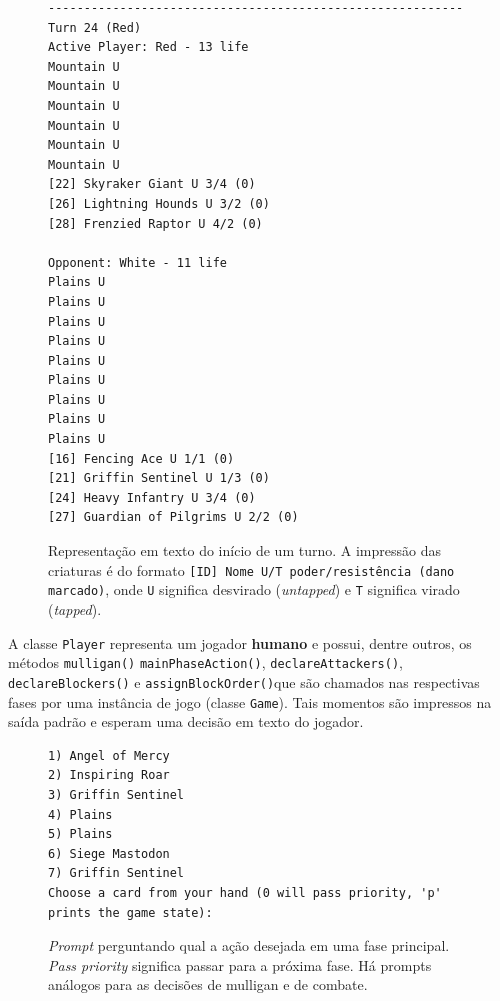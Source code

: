 \begin{figure}[h!]
\begin{Verbatim}
----------------------------------------------------------
Turn 24 (Red)
Active Player: Red - 13 life
Mountain U
Mountain U
Mountain U
Mountain U
Mountain U
Mountain U
[22] Skyraker Giant U 3/4 (0)
[26] Lightning Hounds U 3/2 (0)
[28] Frenzied Raptor U 4/2 (0)

Opponent: White - 11 life
Plains U
Plains U
Plains U
Plains U
Plains U
Plains U
Plains U
Plains U
Plains U
[16] Fencing Ace U 1/1 (0)
[21] Griffin Sentinel U 1/3 (0)
[24] Heavy Infantry U 3/4 (0)
[27] Guardian of Pilgrims U 2/2 (0)
\end{Verbatim}
\caption{Representação em texto do início de um turno. A impressão das criaturas é do formato \texttt{[ID] Nome U/T poder/resistência (dano marcado)}, onde \texttt{U} significa desvirado (\textit{untapped}) e \texttt{T} significa virado (\textit{tapped}).}
\end{figure}

A classe \texttt{Player} representa um jogador \textbf{humano} e possui, dentre outros, os métodos \texttt{mulligan()} \texttt{mainPhaseAction()}, \texttt{declareAttackers()}, \texttt{declareBlockers()}  e \texttt{assignBlockOrder()}que são chamados nas respectivas fases por uma instância de jogo (classe \texttt{Game}). Tais momentos são impressos na saída padrão e esperam uma decisão em texto do jogador.

\begin{figure}[h!]
  \begin{center}
  \begin{Verbatim}
1) Angel of Mercy
2) Inspiring Roar
3) Griffin Sentinel
4) Plains
5) Plains
6) Siege Mastodon
7) Griffin Sentinel
Choose a card from your hand (0 will pass priority, 'p' prints the game state):
  \end{Verbatim}
\end{center}
  \caption{\textit{Prompt} perguntando qual a ação desejada em uma fase principal. \textit{Pass priority} significa passar para a próxima fase. Há prompts análogos para as decisões de mulligan e de combate.}
  \label{mainactionprompt}
\end{figure}

